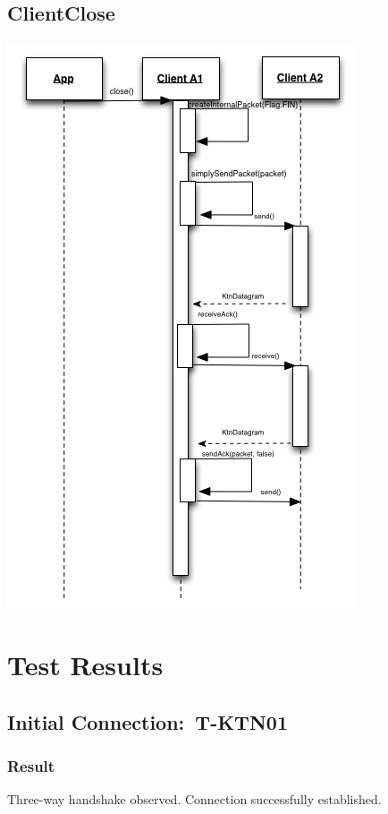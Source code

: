 \documentclass{article}
\begin{document}
\subsection{ClientClose}

\includegraphics[scale=1]{ktnClientClose.png}

\section{Test Results}

\subsection{Initial Connection:\ T-KTN01}

\subsubsection{Result}

Three-way handshake observed. Connection successfully established.
\end{document}
